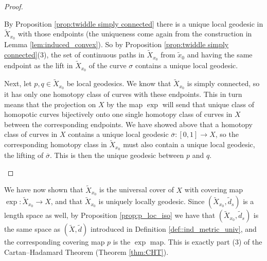 \documentclass[11pt, a4paper, oneside]{memoir}
\theoremstyle{plain}\newtheorem{theorem}[subsection]{Theorem}
\theoremstyle{definition}
\newcommand{\twiddle}[1]{\widetilde{#1}}
\begin{document}
\begin{proof}
\begin{enumerate}
By Proposition \ref{prop:twiddle simply connected} there is a unique local geodesic in \(\twiddle{X}_{x_0}\) with those endpoints (the uniqueness come again from the construction in Lemma \ref{lem:induced_convex}). So by Proposition \ref{prop:twiddle simply connected}(3),  the set of continuous paths in \(\twiddle{X}_{x_0}\) from \(\twiddle{x}_0\) and having the same endpoint as the lift in $\twiddle{X}_{x_0}$ of the curve $\sigma$ contains a unique local geodesic.

Next, let \(p,q\in\twiddle{X}_{x_0}\) be local geodesics.
We know that \(\twiddle{X}_{x_0}\) is simply connected, so it has only one homotopy class of curves with these endpoints.
This in turn means that the projection on \(X\) by the map $\exp$ will send that unique class of homopotic curves bijectively onto one single homotopy class of curves in $X$ between the corresponding endpoints.
We have showed above that a homotopy class of curves in $X$ contains a unique local geodesic \(\overline{\sigma}:[0,1]\to X\), so the corresponding homotopy class in \(\twiddle{X}_{x_0}\) must also contain a unique local geodesic, the lifting of \(\overline{\sigma}\).
This is then the unique geodesic between \(p\) and \(q\).
\end{enumerate}
\end{proof}

 We have now shown that \(\twiddle{X}_{x_0}\) is the universal cover of \(X\) with covering map \(\exp:\twiddle{X}_{x_0}\to X\), and that $\twiddle{X}_{x_0}$ is uniquely locally geodesic. Since \((\twiddle{X}_{x_0}, \twiddle{d}_s)\) is a length space as well, by Proposition \ref{prop:p_loc_iso} we have that \((\twiddle{X}_{x_0}, \twiddle{d}_s)\) is the same space as $(\twiddle{X}, \twiddle{d})$ introduced in Definition \ref{def::ind_metric_univ}, and the corresponding covering map $p$ is the $\exp$ map. This is exactly part (3) of the Cartan--Hadamard Theorem (Theorem \ref{thm:CHT}).
\end{document}

